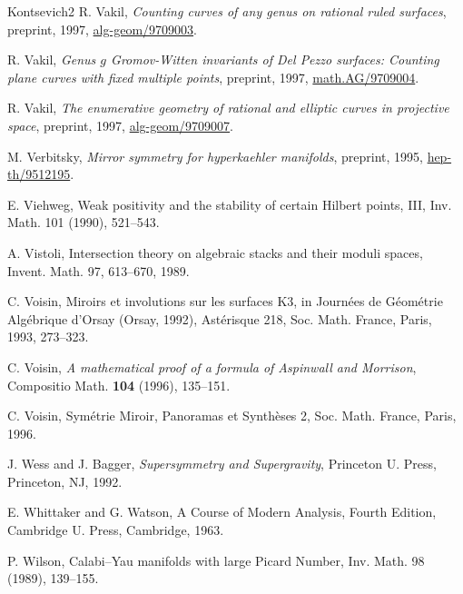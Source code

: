 \begin{thebibliography}{Kontsevich2}
\hypertarget{bib:Vakil1}{} R. Vakil, \emph{Counting curves of any genus on rational ruled surfaces}, preprint, 1997, \href{https://arxiv.org/abs/alg-geom/9709003}{alg-geom/9709003}.

\hypertarget{bib:Vakil2}{} R. Vakil, \emph{Genus $g$ Gromov-Witten invariants of Del Pezzo surfaces: Counting plane curves with fixed multiple points}, preprint, 1997, \href{https://arxiv.org/abs/alg-geom/9709004}{math.AG/9709004}.

\hypertarget{bib:Vakil3}{} R. Vakil, \emph{The enumerative geometry of rational and elliptic curves in projective space}, preprint, 1997, \href{https://arxiv.org/abs/alg-geom/9709007}{alg-geom/9709007}.

\hypertarget{bib:Verbitsky}{} M. Verbitsky, \emph{Mirror symmetry for hyperkaehler manifolds}, preprint, 1995, \href{https://arxiv.org/abs/hep-th/9512195}{hep-th/9512195}.

\hypertarget{bib:Viehweg}{}
E. Viehweg, Weak positivity and the stability of certain Hilbert points, III, Inv. Math. 101 (1990), 521--543.

\hypertarget{bib:Vistoli}{}
A. Vistoli, Intersection theory on algebraic stacks and their moduli spaces, Invent. Math. 97, 613--670, 1989.

\hypertarget{bib:Voisin1}{}
C. Voisin, Miroirs et involutions sur les surfaces K3,
in Journées de Géométrie Algébrique d'Orsay (Orsay, 1992), Astérisque 218,
Soc. Math. France, Paris, 1993, 273--323.

\hypertarget{bib:Voisin2}{} C. Voisin, \emph{A mathematical proof of a formula of Aspinwall and Morrison}, Compositio Math. \textbf{104} (1996), 135--151.

\hypertarget{bib:Voisin3}{}
C. Voisin, Symétrie Miroir, Panoramas et Synthèses 2,
Soc. Math. France, Paris, 1996.

\hypertarget{bib:WB}{} J. Wess and J. Bagger, \emph{Supersymmetry and Supergravity}, Princeton U. Press, Princeton, NJ, 1992.

\hypertarget{bib:WW}{}
E. Whittaker and G. Watson, A Course of Modern Analysis, Fourth Edition, Cambridge U. Press, Cambridge, 1963.

\hypertarget{bib:Wilson1}{}
P. Wilson, Calabi--Yau manifolds with large Picard Number, Inv. Math. 98 (1989), 139--155.


\end{thebibliography}
